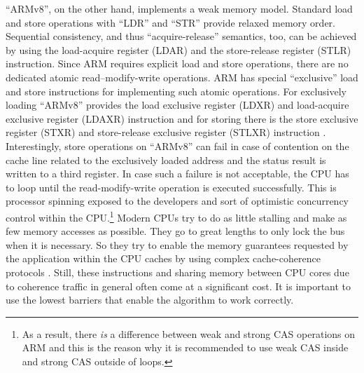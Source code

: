 “ARMv8”, on the other hand, implements a weak memory model. Standard load and store operations with “LDR” and “STR” provide relaxed memory order. Sequential consistency, and thus “acquire-release” semantics, too, can be achieved by using the load-acquire register (LDAR) and the store-release register (STLR) instruction. Since ARM requires explicit load and store operations, there are no dedicated atomic read–modify-write operations. ARM has special “exclusive” load and store instructions for implementing such atomic operations. For exclusively loading  “ARMv8” provides the load exclusive register (LDXR) and load-acquire exclusive register (LDAXR) instruction and for storing there is the store exclusive register (STXR) and store-release exclusive register (STLXR) instruction \cite{arm:v8}. Interestingly, store operations on “ARMv8” can fail in case of contention on the cache line related to the exclusively loaded address and the status result is written to a third register. In case such a failure is not acceptable, the CPU has to loop until the read-modify-write operation is executed successfully. This is processor spinning exposed to the developers and sort of optimistic concurrency control within the CPU.\footnote{As a result, there \textit{is} a difference between weak and strong CAS operations on ARM and this is the reason why it is recommended to use weak CAS inside and strong CAS outside of loops.}\newline
Modern CPUs try to do as little stalling and make as few memory accesses as possible. They go to great lengths to only lock the bus when it is necessary.
So they try to enable the memory guarantees requested by the application within the CPU caches by using complex cache-coherence protocols \cite[473-476]{herlihy:art_of_mp}. Still, these instructions and sharing memory between CPU cores due to coherence traffic in general often come at a significant cost. It is important to use the lowest barriers that enable the algorithm to work correctly. \newline
